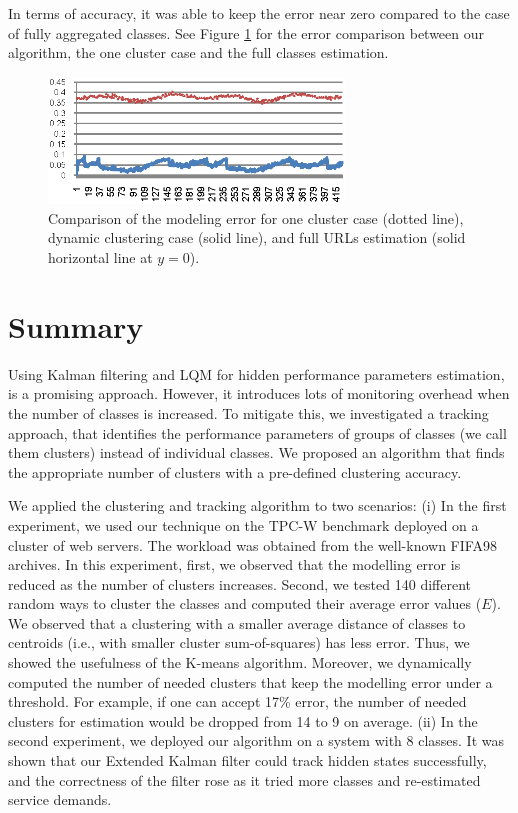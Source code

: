 In terms of accuracy, it was able to keep the error near zero compared to the case of fully aggregated classes. See Figure \ref{fig:comparison-of-modeling-error} for the error comparison between our algorithm, the one cluster case and the full classes estimation. 
\begin{figure}[h]
	\centering
	\includegraphics[width=0.7\textwidth]{image/comparison-modeling-error-one-cluster-dynamic.eps}
	\caption[Comparison of the modeling error for one cluster case, dynamic clustering case, and full classes estimation.]{Comparison of the modeling error for one cluster case (dotted line), dynamic clustering case (solid line), and full URLs estimation (solid horizontal line at $y=0$).}
	\label{fig:comparison-of-modeling-error}
\end{figure}

\section{Summary} 
\label{sec:conclusions-and-future-work} 
   Using Kalman filtering and LQM for hidden performance parameters estimation, is a promising approach. However, it introduces lots of monitoring overhead when the number of classes is increased. To mitigate this, we investigated a tracking approach, that identifies the performance parameters of groups of classes (we call them clusters) instead of individual classes. We proposed an algorithm that finds the appropriate number of clusters with a pre-defined clustering accuracy. 

We applied the clustering and tracking algorithm to two scenarios: 
(i) In the first experiment, we used our technique on the TPC-W benchmark deployed on a cluster of web servers. The workload was obtained from the well-known FIFA98 archives. In this experiment, first, we observed that the modelling error is reduced as the number of clusters increases. Second, we tested 140 different random ways to cluster the classes and computed their average error values ($E$). We observed that a clustering with a smaller average distance of classes to centroids (i.e., with smaller cluster sum-of-squares) has less error. Thus, we showed the usefulness of the K-means algorithm. Moreover, we dynamically computed the number of needed clusters that keep the modelling error under a threshold. For example, if one can accept 17\% error, the number of needed clusters for estimation would be dropped from 14 to 9 on average.
(ii) In the second experiment, we deployed our algorithm on a system with 8 classes. It was shown that our Extended Kalman filter could track hidden states successfully, and the correctness of the filter rose as it tried more classes and re-estimated service demands.

